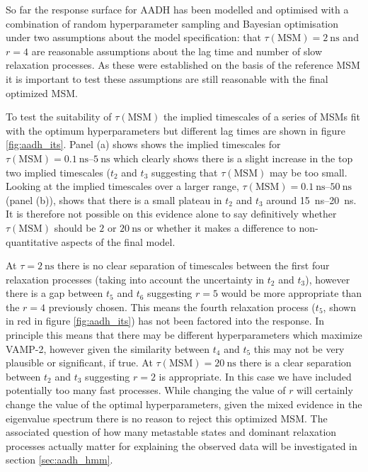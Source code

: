 So far the response surface for AADH has been modelled and optimised with a combination of random hyperparameter sampling and Bayesian optimisation under two assumptions about the model specification: that $\tau(\mathrm{MSM}) = \SI{2}{\nano\second}$ and $r=4$ are reasonable assumptions about the lag time and number of slow relaxation processes. As these were established on the basis of the reference MSM it is important to test these assumptions are still reasonable with the final optimized MSM. 

To test the suitability of $\tau(\mathrm{MSM})$ the implied timescales of a series of MSMs fit with the optimum hyperparameters but different lag times are shown in figure \ref{fig:aadh_its}. Panel (a) shows shows the implied timescales for $\tau(\mathrm{MSM}) = \SIrange[range-phrase=--]{0.1}{5}{\nano\second}$ which clearly shows there is a slight increase in the top two implied timescales ($t_{2}$ and $t_{3}$ suggesting that $\tau(\mathrm{MSM})$ may be too small. Looking at the implied timescales over a larger range, $\tau(\mathrm{MSM}) = \SIrange[range-phrase=--]{0.1}{50}{\nano\second}$ (panel (b)), shows that there is a small plateau in $t_{2}$ and $t_{3}$  around  \SIrange{15}{20}{\nano\second}. It is therefore not possible on this evidence alone to say definitively whether $\tau(\mathrm{MSM})$ should be $2$ or $\SI{20}{\nano\second}$ or whether it makes a difference to non-quantitative aspects of the final model.  

At $\tau = \SI{2}{\nano\second}$ there is no clear separation of timescales between the first four relaxation processes (taking into account the uncertainty in $t_{2}$ and $t_{3}$), however there is a gap between $t_{5}$ and $t_{6}$ suggesting $r=5$ would be more appropriate than the $r=4$ previously chosen. This means the fourth relaxation process ($t_{5}$, shown in red in figure \ref{fig:aadh_its}) has not been factored into the response. In principle this means that there may be different hyperparameters which maximize VAMP-2, however given the similarity between $t_{4}$ and $t_{5}$ this may not be very plausible or significant, if true. At $\tau(\mathrm{MSM}) = \SI{20}{\nano\second}$ there is a clear separation between $t_{2}$ and $t_{3}$ suggesting $r=2$ is appropriate. In this case we have included potentially too many fast processes. While changing the value of $r$ will certainly change the value of the optimal hyperparameters, given the mixed evidence in the eigenvalue spectrum there is no reason to reject this optimized MSM. The associated question of how many metastable states and dominant relaxation processes actually matter for explaining the observed data will be investigated in section \ref{sec:aadh_hmm}. 

